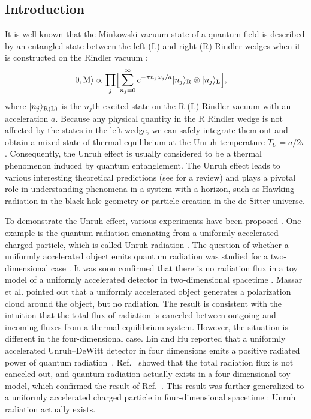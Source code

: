 \documentclass[aps,prd,preprintnumbers,nofootinbib,showpacs,11pt]{revtex4}%
\begin{document}
\begin{widetext}
\section{Introduction}
It is well known that the Minkowski vacuum state of a quantum field is described by an entangled state
between the left (L) and right (R) Rindler wedges when it is constructed on the Rindler vacuum \cite{UnruhWald}:
\begin{eqnarray}
\hspace{-5mm}
  |0,{\rm M}\rangle \propto \prod_j\Bigl[
\sum_{n_j=0}^\infty e^{-\pi n_j \omega_j /a } |n_j \rangle_{\rm R} \otimes|n_j\rangle_{\rm L}
\Bigr]  ,
\label{RLentangle}
\end{eqnarray}
where $|n_j \rangle_{\rm R(L)}$ is the $n_j$th excited state on the R (L) Rindler vacuum
with an acceleration $a$.
Because any physical quantity in the R Rindler wedge is not affected by  
the states in the left wedge, we can safely integrate them out and obtain a mixed state of
thermal equilibrium at the Unruh temperature $T_U=a/2\pi$  \cite{Unruh,UnruhWald}.
Consequently, the Unruh effect is usually considered to be a thermal phenomenon induced by 
quantum entanglement. 
The Unruh effect leads to various interesting theoretical predictions (see \cite{Higuchi} for a review) 
and plays a pivotal role in understanding phenomena in a system with a 
horizon, such as Hawking radiation in the black hole geometry or 
particle creation in the de Sitter universe. 

To demonstrate the Unruh effect, various experiments have been proposed 
\cite{Bell1,Bel2,SokolovTernov,SokolovTernov2,BarberMane,Unruh1998,Muller,Vanzella,SuzukiYamada,Vanzella2}.
One example is the quantum radiation emanating from a uniformly accelerated 
charged particle, which is called Unruh radiation 
\cite{ChenTajima,Schutzhold,Schutzhold2,ELI,Cozzella,LH,LH2,IYZ,Lin}.
The question of whether a uniformly accelerated object emits quantum radiation was studied
 for a two-dimensional case \cite{Grove,Raine}. 
It was soon confirmed that there is no radiation flux in a toy model 
of a uniformly accelerated detector in two-dimensional spacetime \cite{HuRaval}.
Massar et al. \cite{Massar} pointed out 
that a uniformly accelerated object generates a polarization cloud around the object,
but no radiation. 
The result is consistent with the intuition that the total flux of radiation is canceled
between outgoing and incoming fluxes from a thermal equilibrium system. 
However, the situation is different in the four-dimensional case. Lin and Hu reported that
a uniformly accelerated Unruh--DeWitt detector in four dimensions emits a 
positive radiated power of quantum radiation~\cite{LH,LH2}. 
Ref.~\cite{IOTYZ} showed that the total radiation flux is not canceled out,
and quantum radiation actually exists in a four-dimensional toy model, which 
confirmed the result of Ref.~\cite{LH,LH2}. 
This result was further generalized to a uniformly accelerated charged particle in 
four-dimensional spacetime \cite{IYZ,OYZ15,OYZ16}: Unruh radiation actually exists.


\end{widetext}
\end{document}
